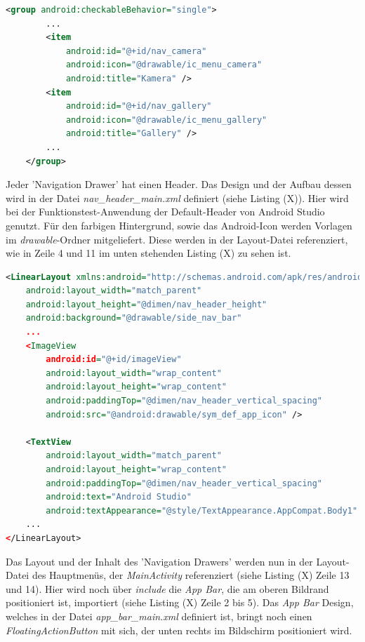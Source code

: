 \begin{lstlisting}[caption=Definition der Menüpunkte im 'Navigation Drawer' der Hauptseite in der Datei \textit{activity\_main\_drawer.xml}, label=lst:DrawerMenu, language=XML]
<group android:checkableBehavior="single">      
		...              
        <item
            android:id="@+id/nav_camera"
            android:icon="@drawable/ic_menu_camera"
            android:title="Kamera" />
        <item
            android:id="@+id/nav_gallery"
            android:icon="@drawable/ic_menu_gallery"
            android:title="Gallery" />       
		...               
    </group>
\end{lstlisting} 

Jeder 'Navigation Drawer' hat einen Header. Das Design und der Aufbau dessen wird in der Datei \textit{nav\_header\_main.xml} definiert (siehe Listing (X)). Hier wird bei der Funktionstest-Anwendung der Default-Header von Android Studio genutzt. Für den farbigen Hintergrund, sowie das Android-Icon werden Vorlagen im \textit{drawable}-Ordner mitgeliefert. Diese werden in der Layout-Datei referenziert, wie in Zeile 4 und 11 im unten stehenden Listing (X) zu sehen ist.
\clearpage

\begin{lstlisting}[caption=Definition des Headers des 'Navigation Drawers' in der Datei \textit{nav\_header\_main.xml}, label=lst:DrawerHeader, language=XML]
<LinearLayout xmlns:android="http://schemas.android.com/apk/res/android"
    android:layout_width="match_parent"
    android:layout_height="@dimen/nav_header_height"
    android:background="@drawable/side_nav_bar"    
    ...
    <ImageView
        android:id="@+id/imageView"
        android:layout_width="wrap_content"
        android:layout_height="wrap_content"
        android:paddingTop="@dimen/nav_header_vertical_spacing"
        android:src="@android:drawable/sym_def_app_icon" />

    <TextView
        android:layout_width="match_parent"
        android:layout_height="wrap_content"
        android:paddingTop="@dimen/nav_header_vertical_spacing"
        android:text="Android Studio"
        android:textAppearance="@style/TextAppearance.AppCompat.Body1" />
    ...
</LinearLayout>
\end{lstlisting} 

Das Layout und der Inhalt des 'Navigation Drawers' werden nun in der Layout-Datei des Hauptmenüs, der \textit{MainActivity} referenziert (siehe Listing (X) Zeile 13 und 14). Hier wird noch über \textit{include} die \textit{App Bar}, die am oberen Bildrand positioniert ist, importiert (siehe Listing (X) Zeile 2 bis 5). Das \textit{App Bar} Design, welches in der Datei \textit{app\_bar\_main.xml} definiert ist, bringt noch einen \textit{FloatingActionButton} mit sich, der unten rechts im Bildschirm positioniert wird. 

